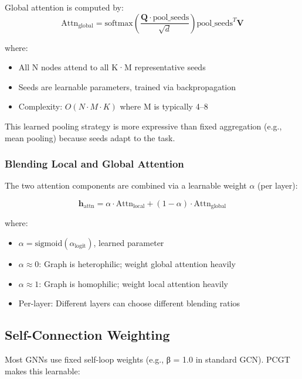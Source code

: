 \documentclass[11pt, a4paper]{article}
\begin{document}
Global attention is computed by:
\begin{equation}
\text{Attn}_{\text{global}} = \text{softmax}\left( \frac{\mathbf{Q} \cdot \text{pool\_seeds}}{\sqrt{d}} \right) \text{pool\_seeds}^T \mathbf{V}
\end{equation}

where:
\begin{itemize}
    \item All N nodes attend to all K·M representative seeds
    \item Seeds are learnable parameters, trained via backpropagation
    \item Complexity: $O(N \cdot M \cdot K)$ where M is typically 4–8
\end{itemize}

This learned pooling strategy is more expressive than fixed aggregation (e.g., mean pooling) because seeds adapt to the task.

\subsubsection{Blending Local and Global Attention}

The two attention components are combined via a learnable weight $\alpha$ (per layer):

\begin{equation}
\mathbf{h}_{\text{attn}} = \alpha \cdot \text{Attn}_{\text{local}} + (1 - \alpha) \cdot \text{Attn}_{\text{global}}
\end{equation}

where:
\begin{itemize}
    \item $\alpha = \text{sigmoid}(\alpha_{\text{logit}})$, learned parameter
    \item $\alpha \approx 0$: Graph is heterophilic; weight global attention heavily
    \item $\alpha \approx 1$: Graph is homophilic; weight local attention heavily
    \item Per-layer: Different layers can choose different blending ratios
\end{itemize}

\subsection{Self-Connection Weighting}

Most GNNs use fixed self-loop weights (e.g., β = 1.0 in standard GCN). PCGT makes this learnable:
\end{document}
